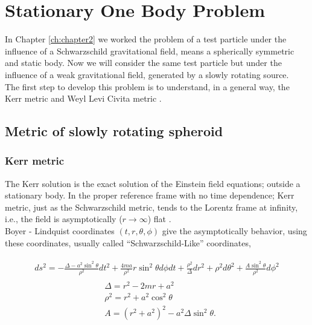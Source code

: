 \chapter{Stationary One Body Problem}\label{ch: rotation}

In Chapter \ref{ch:chapter2} we worked the problem of a test particle under the influence of a Schwarzschild gravitational field, means a spherically symmetric and static body. Now we will consider the same test particle but under the influence of a weak gravitational field, generated by a slowly rotating source. \\

The first step to develop this problem is to understand, in a general way, the Kerr metric and Weyl Levi Civita metric \cite{Raine, Frolov, johnandcoulter, erezandrosen}.

\section{Metric of slowly rotating spheroid}

\subsection{Kerr metric}

The Kerr solution is the exact solution of the Einstein field equations; outside a stationary body. In the proper reference frame with no time dependence; Kerr metric, just as the Schwarzschild metric, tends to the Lorentz frame at infinity, i.e., the field is asymptotically ($r \rightarrow \infty$) flat \cite{Brumberg,  Frolov, Raine}.\\

Boyer - Lindquist coordinates $(t,r,\theta, \phi)$ give the asymptotically behavior, using these coordinates, usually called ``Schwarzschild-Like'' coordinates,

\begin{align}
\begin{split}
	ds^2 = -\frac{\Delta - a^2\sin^2\theta}{\rho^2} dt^2 +\frac{4ma}{\rho^2} r \sin^2\theta d\phi dt +\frac{\rho^2}{\Delta}dr^2 + \rho^2 d\theta^2 + \frac{A\sin^2\theta}{\rho^2}d\phi^2
	\label{eq: kerrmetric}
\end{split}
\end{align}
\begin{subequations}
\begin{align}
	&\Delta = r^2 - 2mr +a^2\\
	&\rho^2 = r^2 + a^2\cos^2\theta\\
	\label{eq: Ag33}
	&A = (r^2+a^2)^2 - a^2\Delta \sin^2\theta.
\end{align}
\end{subequations}

